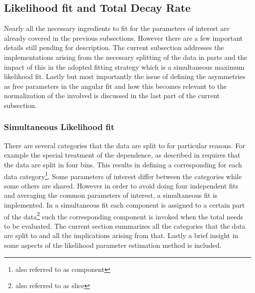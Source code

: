 \subsection{Likelihood fit and Total Decay Rate}
\label{Total_Decay_Rate}

Nearly all the necessary ingredients to fit for the parameters of interest are already covered in the previous subsections.
However there are a few important details still pending for description. The current subsection addresses the
implementations arising from the necessary splitting of the data in parts and the impact of this in the adopted
fitting strategy which is a simultaneous maximum likelihood fit. Lastly but most importantly the issue of defining the \ACP
asymmetries as free parameters in the angular fit and how this becomes relevant to the normalization of the \pdfs
involved is discussed in the last part of the current subsection.

\subsubsection{Simultaneous Likelihood fit}
\label{Simutaneous_Likelihood_fit}
There are several categories that the data are split to for particular reasons.
For example the special treatment of the \mkpi dependence, as described in  requires that the data are
split in four \mkpi bins. This results in defining a corresponding \pdf for each data category\footnote{also referred to as component \pdf}.
Some parameters of interest differ between the categories while some others are shared.
However in order to avoid doing four independent fits and averaging the common parameters of interest,
a simultaneous fit is implemented. In a simultaneous fit each component \pdf is assigned to a certain part of the data\footnote{also referred to as slice}
such the corresponding component \pdf is invoked when the total \pdf needs to be evaluated. The current section summarizes
all the categories that the data are split to and all the implications arising from that. Lastly a brief insight in some aspects
of the likelihood parameter estimation method is included.

